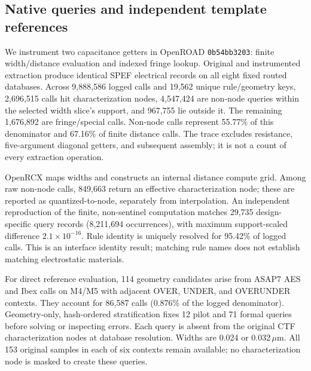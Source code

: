 \documentclass[conference,9pt,letterpaper]{IEEEtran}
\begin{document}
\subsection{Native queries and independent template references}
We instrument two capacitance getters in OpenROAD
\texttt{0b54bb3203}: finite width/distance evaluation and indexed fringe lookup.
Original and instrumented extraction produce identical SPEF electrical records
on all eight fixed routed databases. Across 9,888,586 logged calls and 19,562
unique rule/geometry keys, 2,696,515 calls hit characterization nodes,
4,547,424 are non-node queries within the selected width slice's support,
and 967,755 lie outside it. The remaining 1,676,892 are fringe/special calls.
Non-node calls represent 55.77\% of this denominator and 67.16\% of finite
distance calls. The trace excludes resistance, five-argument diagonal getters,
and subsequent assembly; it is not a count of every extraction operation.



OpenRCX maps widths and constructs an internal distance compute grid.
Among raw non-node calls, 849,663 return an effective characterization node;
these are reported as quantized-to-node, separately from interpolation.
An independent reproduction of the finite, non-sentinel computation matches
29,735 design-specific query records (8,211,694 occurrences), with maximum
support-scaled difference $2.1\times10^{-16}$. Rule identity is uniquely
resolved for 95.42\% of logged calls. This is an interface identity result;
matching rule names does not establish matching electrostatic materials.

\begin{table}[t]
\centering\caption{Off-grid query comparisons, macro NRMSE. Native agreement: 480 queries from 42 source-held-out rule groups, using every supplied rule sample and actual OpenRCX returns as reference. FEM: 71 independent template queries with 153 matched support samples per context. Weighted FEM uses occurrence counts divided by sampling probability. Native agreement and direct physical error have different references and units; compare methods only within a column.}
\label{tab:offgrid}\scriptsize\setlength{\tabcolsep}{2pt}
\end{table}

For direct reference evaluation, 114 geometry candidates arise from ASAP7 AES
and Ibex calls on M4/M5 with adjacent OVER, UNDER, and OVERUNDER contexts.
They account for 86,587 calls (0.876\% of the logged denominator).
Geometry-only, hash-ordered stratification fixes 12 pilot and 71 formal queries
before solving or inspecting errors. Each query is absent from the original
CTF characterization nodes at database resolution. Widths are 0.024 or
0.032\,$\mu$m. All 153 original samples in each of six contexts remain available;
no characterization node is masked to create these queries.
\end{document}
